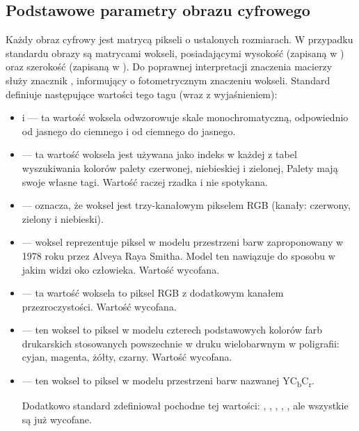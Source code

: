 \subsection{Podstawowe parametry obrazu cyfrowego}

\dicomtagExplanations

\par
Każdy obraz cyfrowy jest matrycą pikseli o ustalonych rozmiarach.
W przypadku standardu \DICOM obrazy są matrycami wokseli, posiadającymi wysokość (zapisaną w ) oraz szerokość (zapisaną w ).
Do poprawnej interpretacji znaczenia macierzy służy znacznik , informujący o fotometrycznym znaczeniu wokseli.
Standard \DICOM definiuje następujące wartości tego tagu (wraz z wyjaśnieniem):
\begin{itemize}
    \item {} i  --- ta wartość woksela odwzorowuje skale monochromatyczną, odpowiednio od jasnego do ciemnego i od ciemnego do jasnego.

    \item {} --- ta wartość woksela jest używana jako indeks w każdej z tabel wyszukiwania kolorów palety czerwonej, niebieskiej i zielonej,
          Palety mają swoje własne tagi.
          Wartość raczej rzadka i nie spotykana.

    \item {} --- oznacza, że woksel jest trzy-kanałowym pikselem RGB (kanały: czerwony, zielony i niebieski).

    \item {}  --- woksel reprezentuje piksel w modelu przestrzeni barw zaproponowany w 1978 roku przez Alveya Raya Smitha.
          Model ten nawiązuje do sposobu w jakim widzi oko człowieka.
          Wartość wycofana.

    \item {} --- ta wartość woksela to piksel RGB z dodatkowym kanałem przezroczystości.
          Wartość wycofana.

    \item {} --- ten woksel to piksel w modelu czterech podstawowych kolorów farb drukarskich stosowanych powszechnie w druku wielobarwnym w poligrafii: cyjan, magenta, żółty, czarny.
          Wartość wycofana.

    \item {} --- ten woksel to piksel w modelu przestrzeni barw nazwanej YC\textsubscript{b}C\textsubscript{r}.

          Dodatkowo standard zdefiniował pochodne tej wartości: , , , , , ale wszystkie są już wycofane.
\end{itemize}

